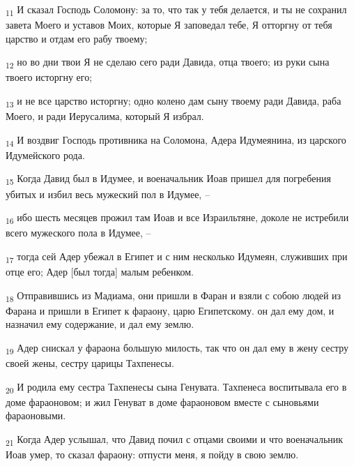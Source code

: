 \begin{tcolorbox}
\textsubscript{11} И сказал Господь Соломону: за то, что так у тебя делается, и ты не сохранил завета Моего и уставов Моих, которые Я заповедал тебе, Я отторгну от тебя царство и отдам его рабу твоему;
\end{tcolorbox}
\begin{tcolorbox}
\textsubscript{12} но во дни твои Я не сделаю сего ради Давида, отца твоего; из руки сына твоего исторгну его;
\end{tcolorbox}
\begin{tcolorbox}
\textsubscript{13} и не все царство исторгну; одно колено дам сыну твоему ради Давида, раба Моего, и ради Иерусалима, который Я избрал.
\end{tcolorbox}
\begin{tcolorbox}
\textsubscript{14} И воздвиг Господь противника на Соломона, Адера Идумеянина, из царского Идумейского рода.
\end{tcolorbox}
\begin{tcolorbox}
\textsubscript{15} Когда Давид был в Идумее, и военачальник Иоав пришел для погребения убитых и избил весь мужеский пол в Идумее, --
\end{tcolorbox}
\begin{tcolorbox}
\textsubscript{16} ибо шесть месяцев прожил там Иоав и все Израильтяне, доколе не истребили всего мужеского пола в Идумее, --
\end{tcolorbox}
\begin{tcolorbox}
\textsubscript{17} тогда сей Адер убежал в Египет и с ним несколько Идумеян, служивших при отце его; Адер [был тогда] малым ребенком.
\end{tcolorbox}
\begin{tcolorbox}
\textsubscript{18} Отправившись из Мадиама, они пришли в Фаран и взяли с собою людей из Фарана и пришли в Египет к фараону, царю Египетскому. он дал ему дом, и назначил ему содержание, и дал ему землю.
\end{tcolorbox}
\begin{tcolorbox}
\textsubscript{19} Адер снискал у фараона большую милость, так что он дал ему в жену сестру своей жены, сестру царицы Тахпенесы.
\end{tcolorbox}
\begin{tcolorbox}
\textsubscript{20} И родила ему сестра Тахпенесы сына Генувата. Тахпенеса воспитывала его в доме фараоновом; и жил Генуват в доме фараоновом вместе с сыновьями фараоновыми.
\end{tcolorbox}
\begin{tcolorbox}
\textsubscript{21} Когда Адер услышал, что Давид почил с отцами своими и что военачальник Иоав умер, то сказал фараону: отпусти меня, я пойду в свою землю.
\end{tcolorbox}
